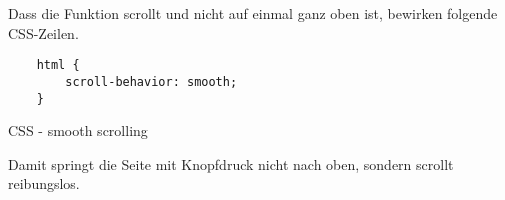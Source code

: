 Dass die Funktion scrollt und nicht auf einmal ganz oben ist, bewirken folgende CSS-Zeilen.

\begin{code}[htp]
\begin{lstlisting}
    html {
        scroll-behavior: smooth;
    }
\end{lstlisting}
\caption{CSS - smooth scrolling}
\end{code}

Damit springt die Seite mit Knopfdruck nicht nach oben, sondern scrollt reibungslos.